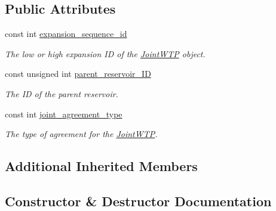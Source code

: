 \subsection*{Public Attributes}
\begin{DoxyCompactItemize}
\item 
const int \mbox{\hyperlink{classJointWTP_a0e10a7f7ade04d5f3572f185de1b8653}{expansion\+\_\+sequence\+\_\+id}}
\begin{DoxyCompactList}\small\item\em The low or high expansion ID of the \mbox{\hyperlink{classJointWTP}{Joint\+W\+TP}} object. \end{DoxyCompactList}\item 
const unsigned int \mbox{\hyperlink{classJointWTP_aa5830cb4d3013a004b7168f4dbf475eb}{parent\+\_\+reservoir\+\_\+\+ID}}
\begin{DoxyCompactList}\small\item\em The ID of the parent reservoir. \end{DoxyCompactList}\item 
const int \mbox{\hyperlink{classJointWTP_ac5663480c912b1b7cfdfb976b4fa3cec}{joint\+\_\+agreement\+\_\+type}}
\begin{DoxyCompactList}\small\item\em The type of agreement for the \mbox{\hyperlink{classJointWTP}{Joint\+W\+TP}}. \end{DoxyCompactList}\end{DoxyCompactItemize}
\subsection*{Additional Inherited Members}


\subsection{Constructor \& Destructor Documentation}
\mbox{\label{classJointWTP_a1aeeff203eb631ca3bfcf407ab0bbd4f}} 

